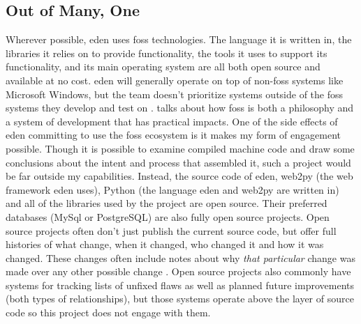 \documentclass[a4paper,man,natbib]{apa6}
\begin{document}
   \subsection*{Out of Many, One}
   Wherever possible, \acrshort{eden} uses \acrshort{foss} technologies. The language it is written in, the libraries it relies on to provide functionality, the tools it uses to support its functionality, and its main operating system are all both open source and available at no cost. \acrshort{eden} will generally operate on top of non-\acrshort{foss} systems like Microsoft Windows, but the team doesn't prioritize systems outside of the \acrshort{foss} systems they develop and test on \citep{Sahana_Foundation2015-zs}. \citet{Kelty2008-jm} talks about how \acrshort{foss} is both a philosophy and a system of development that has practical impacts. One of the side effects of \acrshort{eden} committing to use the \acrshort{foss} ecosystem is it makes my form of engagement possible. Though it is possible to examine compiled machine code and draw some conclusions about the intent and process that assembled it, such a project would be far outside my capabilities. Instead, the source code of \acrshort{eden}, web2py (the \gls{web framework} \acrshort{eden} uses), Python (the language \acrshort{eden} and web2py are written in) and all of the libraries used by the project are open source. Their preferred databases (MySql or PostgreSQL) are also fully open source projects. Open source projects often don't just publish the current source code, but offer full histories of what change, when it changed, who changed it and how it was changed. These changes often include notes about why \textit{that particular} change was made over any other possible change \citep[p. 13-16]{Chacon2014-im}. Open source projects also commonly have systems for tracking lists of unfixed flaws as well as planned future improvements (both types of \citet{Mackenzie2006-hb} relationships), but those systems operate above the layer of source code so this project does not engage with them.
\end{document}
